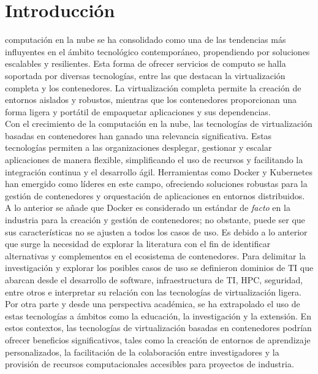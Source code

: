 \section{Introducción}
 computación en la nube se ha consolidado como una de las tendencias más influyentes en el ámbito tecnológico contemporáneo, propendiendo por soluciones escalables y resilientes. Esta forma de ofrecer servicios de computo se halla soportada por diversas tecnologías, entre las que destacan la virtualización completa y los contenedores. La virtualización completa permite la creación de entornos aislados y robustos, mientras que los contenedores proporcionan una forma ligera y portátil de empaquetar aplicaciones y sus dependencias.\\
Con el crecimiento de la computación en la nube, las tecnologías de virtualización basadas en contenedores han ganado una relevancia significativa. Estas tecnologías permiten a las organizaciones desplegar, gestionar y escalar aplicaciones de manera flexible, simplificando el uso de recursos y facilitando la integración continua y el desarrollo ágil. Herramientas como Docker y Kubernetes han emergido como líderes en este campo, ofreciendo soluciones robustas para la gestión de contenedores y orquestación de aplicaciones en entornos distribuidos.\\
A lo anterior se añade que Docker es considerado un estándar de \textit{facto} en la industria para la creación y gestión de contenedores; no obstante, puede ser que sus características no se ajusten a todos los casos de uso. Es debido a lo anterior que surge la necesidad de explorar la literatura con el fin de identificar alternativas y complementos en el ecosistema de contenedores. Para delimitar la investigación y explorar los posibles casos de uso se definieron dominios de TI que abarcan desde el desarrollo de software, infraestructura de TI, HPC, seguridad, entre otros e interpretar su relación con las tecnologías de virtualización ligera.\\
Por otra parte y desde una perspectiva académica, se ha extrapolado el uso de estas tecnologías a ámbitos como la educación, la investigación y la extensión. En estos contextos, las tecnologías de virtualización basadas en contenedores podrían ofrecer beneficios significativos, tales como la creación de entornos de aprendizaje personalizados, la facilitación de la colaboración entre investigadores y la provisión de recursos computacionales accesibles para proyectos de industria.\\